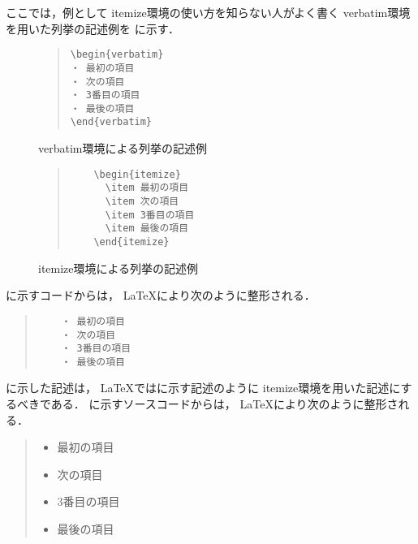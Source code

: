 \documentclass{ujarticle}[11pt]
\newcommand{\figref}[1]{\makebox{図~\ref{#1}}}
\begin{document}
    ここでは，例として itemize環境の使い方を知らない人がよく書く
    verbatim環境を用いた列挙の記述例を
    \figref{fig:verbatim環境による列挙の記述例}に示す．
    \begin{figure}[tb]
    \begin{center}
    \begin{quote}
    \verb|\begin{verbatim}| \\
    \verb|・ 最初の項目| \\
    \verb|・ 次の項目| \\
    \verb|・ 3番目の項目| \\
    \verb|・ 最後の項目| \\
    \verb|\end{verbatim}|
    \end{quote}
    \caption{verbatim環境による列挙の記述例}
    \label{fig:verbatim環境による列挙の記述例}
    \end{center}
    \end{figure}
    \begin{figure}[tb]
    \begin{quote}
    \begin{verbatim}
    \begin{itemize}
      \item 最初の項目
      \item 次の項目
      \item 3番目の項目
      \item 最後の項目
    \end{itemize}
    \end{verbatim}
    \end{quote}
    \caption{itemize環境による列挙の記述例}
    \label{fig:itemize環境による列挙の記述例}
    \end{figure}
    \figref{fig:verbatim環境による列挙の記述例}に示すコードからは，
    \LaTeX により次のように整形される．
    \begin{quote}
    \begin{verbatim}
    ・ 最初の項目
    ・ 次の項目
    ・ 3番目の項目
    ・ 最後の項目
    \end{verbatim}
    \end{quote}
     
    \figref{fig:verbatim環境による列挙の記述例}に示した記述は，
    \LaTeX では\figref{fig:itemize環境による列挙の記述例}に示す記述のように
    itemize環境を用いた記述にするべきである．
    \figref{fig:itemize環境による列挙の記述例}に示すソースコードからは，
    \LaTeX により次のように整形される．
    \begin{quote}
    \begin{itemize}
      \item 最初の項目
      \item 次の項目
      \item 3番目の項目
      \item 最後の項目
    \end{itemize}
    \end{quote}
     
\end{document}
